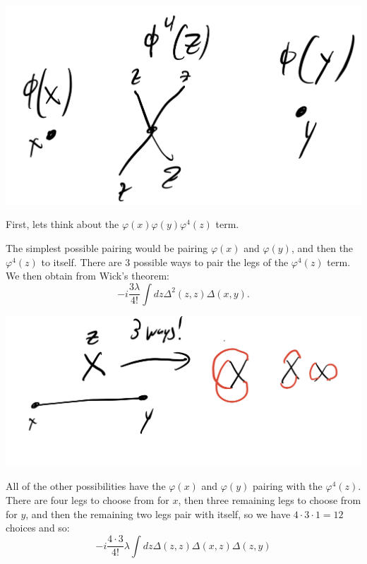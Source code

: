 \begin{center}
   \includegraphics[scale=0.5]{Images/fig-firstordervertices.png}
\end{center}

First, lets think about the $\varphi(x)\varphi(y)\varphi^4(z)$ term.

The simplest possible pairing would be pairing $\varphi(x)$ and $\varphi(y)$, and then the $\varphi^4(z)$ to itself. There are 3 possible ways to pair the legs of the $\varphi^4(z)$ term. We then obtain from Wick's theorem:
\begin{equation}
   -i\frac{3\lambda}{4!}\int dz \Delta^2(z, z)\Delta(x, y).
\end{equation}

\begin{center}
   \includegraphics[scale=0.5]{Images/fig-firstorderpairing1.png}
\end{center}

All of the other possibilities have the $\varphi(x)$ and $\varphi(y)$ pairing with the $\varphi^4(z)$. There are four legs to choose from for $x$, then three remaining legs to choose from for $y$, and then the remaining two legs pair with itself, so we have $4 \cdot 3 \cdot 1 = 12$ choices and so:
\begin{equation}
   -i\frac{4 \cdot 3}{4!}\lambda \int dz \Delta(z, z)\Delta(x, z)\Delta(z, y)
\end{equation}

